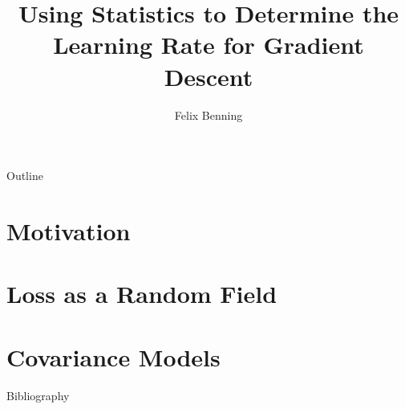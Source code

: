 \documentclass[
	hyperref={unicode, colorlinks=true, linkcolor=.}
]{beamer}
\title{Using Statistics to Determine the Learning Rate for Gradient Descent}
\author{Felix Benning}
\institute{University of Mannheim}
\begin{document}
	\frame{\titlepage}

	\begin{frame}{Outline}
		\tableofcontents
	\end{frame}


	\section{Motivation}

	
	
	
	

	\section{Loss as a Random Field}

	
	
	

	\section{Covariance Models}


	\appendix

	\begin{frame}[allowframebreaks]{Bibliography}
		\printbibliography
	\end{frame}
\end{document}
